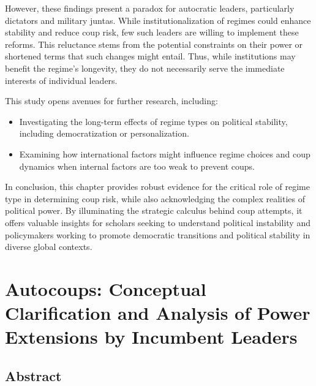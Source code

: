 \documentclass[
  12pt,
]{report}
\begin{document}
However, these findings present a paradox for autocratic leaders,
particularly dictators and military juntas. While institutionalization
of regimes could enhance stability and reduce coup risk, few such
leaders are willing to implement these reforms. This reluctance stems
from the potential constraints on their power or shortened terms that
such changes might entail. Thus, while institutions may benefit the
regime's longevity, they do not necessarily serve the immediate
interests of individual leaders.

This study opens avenues for further research, including:

\begin{itemize}
\item
  Investigating the long-term effects of regime types on political
  stability, including democratization or personalization.
\item
  Examining how international factors might influence regime choices and
  coup dynamics when internal factors are too weak to prevent coups.
\end{itemize}

In conclusion, this chapter provides robust evidence for the critical
role of regime type in determining coup risk, while also acknowledging
the complex realities of political power. By illuminating the strategic
calculus behind coup attempts, it offers valuable insights for scholars
seeking to understand political instability and policymakers working to
promote democratic transitions and political stability in diverse global
contexts.

\chapter{Autocoups: Conceptual Clarification and Analysis of Power
Extensions by Incumbent Leaders}\label{sec-chapter3}

\section*{Abstract}\label{abstract-2}
\end{document}
